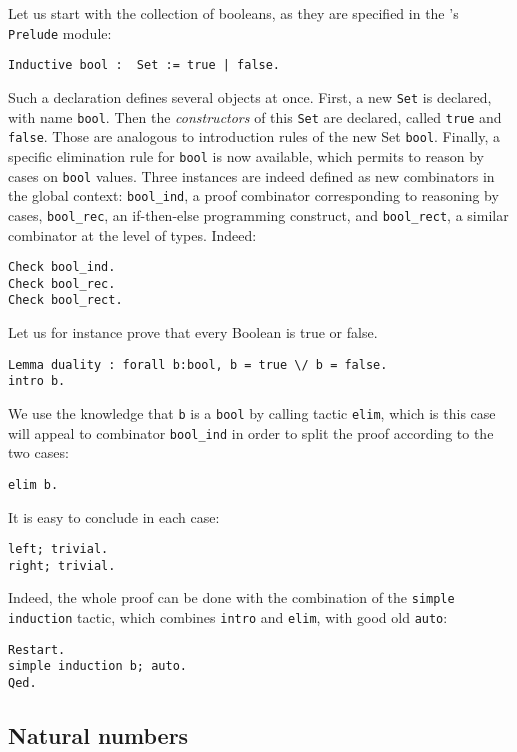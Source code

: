 \documentclass{book}
\begin{document}
Let us start with the collection of booleans, as they are specified
in the \Coq's \verb:Prelude: module: 
\begin{lstlisting}
Inductive bool :  Set := true | false.
\end{lstlisting}

Such a declaration defines several objects at once. First, a new
\verb:Set: is declared, with name \verb:bool:. Then the {\sl constructors}
of this \verb:Set: are declared, called \verb:true: and \verb:false:.
Those are analogous to introduction rules of the new Set \verb:bool:.
Finally, a specific elimination rule for \verb:bool: is now available, which
permits to reason by cases on \verb:bool: values. Three instances are
indeed defined as new combinators in the global context: \verb:bool_ind:,
a proof combinator corresponding to reasoning by cases,
\verb:bool_rec:, an if-then-else programming construct,
and \verb:bool_rect:, a similar combinator at the level of types.
Indeed:
\begin{lstlisting}
Check bool_ind.
Check bool_rec.
Check bool_rect.
\end{lstlisting}

Let us for instance prove that every Boolean is true or false.
\begin{lstlisting}
Lemma duality : forall b:bool, b = true \/ b = false.
intro b.
\end{lstlisting}

We use the knowledge that \verb:b: is a \verb:bool: by calling tactic
\verb:elim:, which is this case will appeal to combinator \verb:bool_ind:
in order to split the proof according to the two cases:
\begin{lstlisting}
elim b.
\end{lstlisting}

It is easy to conclude in each case:
\begin{lstlisting}
left; trivial.
right; trivial.
\end{lstlisting}

Indeed, the whole proof can be done with the combination of the
\verb:simple induction: tactic, which combines \verb:intro: and \verb:elim:,
with good old \verb:auto::
\begin{lstlisting}
Restart.
simple induction b; auto.
Qed.
\end{lstlisting}

\subsection{Natural numbers}
\end{document}

